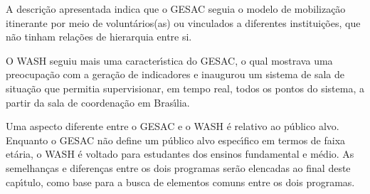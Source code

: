 \documentclass[
12pt,		%
openright,	%
twoside,  %
a4paper,			%
chapter=TITLE,		%
english,			%
french,				%
spanish,			%
brazil				%
]{USPSC-classe/USPSC}
\begin{document}
A descri\c{c}\~ao apresentada indica que o GESAC seguia o modelo de mobiliza\c{c}\~ao itinerante por meio de volunt\'arios(as) ou vinculados a diferentes institui\c{c}\~oes, que n\~ao tinham rela\c{c}\~oes de hierarquia entre si.









O WASH seguiu mais uma caracter\'{\i}stica do GESAC, o qual  mostrava uma preocupa\c{c}\~ao com a gera\c{c}\~ao de indicadores e inaugurou um sistema de \textquotedbl  sala de situa\c{c}\~ao \textquotedbl  que permitia supervisionar, em tempo real, todos os pontos do sistema, a partir da sala de coordena\c{c}\~ao em Bras\'{\i}lia.










\noindent\begin{center}\mbox{\centering{}}\end{center}


Uma aspecto diferente entre o GESAC e o WASH \'e relativo ao p\'ublico alvo. Enquanto o GESAC n\~ao define um p\'ublico alvo espec\'{\i}fico em termos de faixa et\'aria, o WASH \'e voltado para estudantes dos ensinos fundamental e m\'edio. As semelhan\c{c}as e diferen\c{c}as entre os dois programas ser\~ao elencadas ao final deste cap\'{\i}tulo, como base para a busca de elementos comuns entre os dois programas.
\end{document}
